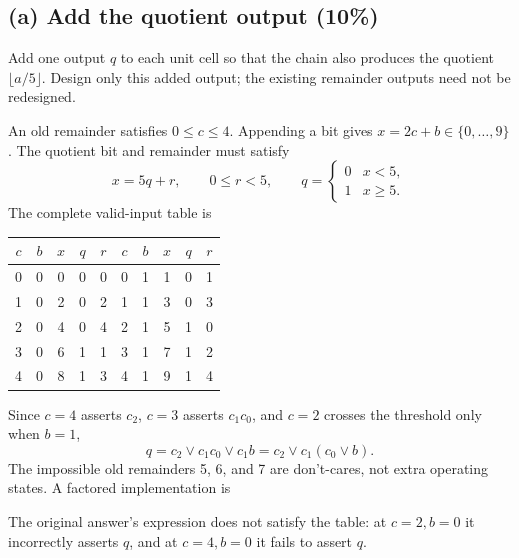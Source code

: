 \subsection{(a) Add the quotient output (10\%)}
\begin{question}
Add one output $q$ to each unit cell so that the chain also produces the quotient $\lfloor a/5\rfloor$. Design only this added output; the existing remainder outputs need not be redesigned.
\end{question}
\begin{solution}
An old remainder satisfies $0\le c\le4$. Appending a bit gives $x=2c+b\in\{0,\ldots,9\}$. The quotient bit and remainder must satisfy
\[
x=5q+r,\qquad 0\le r<5,
\qquad q=\begin{cases}0&x<5,\\1&x\ge5.\end{cases}
\]
The complete valid-input table is
\begin{center}
\begin{tabular}{c c c c c@{\qquad}c c c c c}
\toprule
$c$&$b$&$x$&$q$&$r$&$c$&$b$&$x$&$q$&$r$\\
\midrule
0&0&0&0&0&0&1&1&0&1\\
1&0&2&0&2&1&1&3&0&3\\
2&0&4&0&4&2&1&5&1&0\\
3&0&6&1&1&3&1&7&1&2\\
4&0&8&1&3&4&1&9&1&4\\
\bottomrule
\end{tabular}
\end{center}
Since $c=4$ asserts $c_2$, $c=3$ asserts $c_1c_0$, and $c=2$ crosses the threshold only when $b=1$,
\[
\boxed{q=c_2\vee c_1c_0\vee c_1b=c_2\vee c_1(c_0\vee b).}
\]
The impossible old remainders 5, 6, and 7 are don't-cares, not extra operating states. A factored implementation is
\begin{center}
\end{center}
The original answer's expression does not satisfy the table: at $c=2,b=0$ it incorrectly asserts $q$, and at $c=4,b=0$ it fails to assert $q$.


\end{solution}
